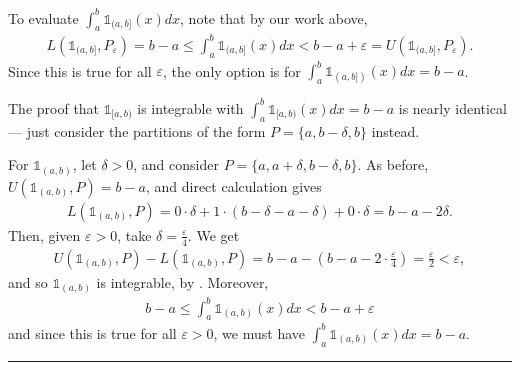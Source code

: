 \documentclass[letterpaper,10pt,english]{jupyterBook}
\begin{document}
\sphinxAtStartPar
To evaluate \(\int_a^b\mathbb{1}_{(a,b]}(x)dx\), note that by our work above,
\begin{equation*}
\begin{split}
L(\mathbb{1}_{(a,b]},P_\varepsilon) = b-a \leq \int_a^b\mathbb{1}_{(a,b]}(x)dx < b-a+\varepsilon = U(\mathbb{1}_{(a,b]},P_\varepsilon).
\end{split}
\end{equation*}
\sphinxAtStartPar
Since this is true for all \(\varepsilon\), the only option is for \( \int_a^b\mathbb{1}_{(a,b])}(x)dx = b-a\).

\sphinxAtStartPar
The proof that \(\mathbb{1}_{[a,b)}\) is integrable with \(\int_a^b\mathbb{1}_{[a,b)}(x)dx = b-a\) is nearly identical — just consider the partitions of the form \(P=\{a,b-\delta,b\}\) instead.

\sphinxAtStartPar
For \(\mathbb{1}_{(a,b)}\), let \(\delta>0\), and consider \(P=\{a,a+\delta,b-\delta,b\}\). As before, \(U(\mathbb{1}_{(a,b)},P)=b-a\), and direct calculation gives
\begin{equation*}
\begin{split}
L(\mathbb{1}_{(a,b)},P)= 0\cdot\delta + 1\cdot(b-\delta-a-\delta)+0\cdot\delta=b-a-2\delta.
\end{split}
\end{equation*}
\sphinxAtStartPar
Then, given \(\varepsilon>0\), take \(\delta=\frac{\varepsilon}{4}\). We get
\begin{equation*}
\begin{split}
U(\mathbb{1}_{(a,b)},P) -L(\mathbb{1}_{(a,b)},P) = b-a - \left(b-a-2\cdot\frac{\varepsilon}{4}\right)= \frac{\varepsilon}{2} < \varepsilon, 
\end{split}
\end{equation*}
\sphinxAtStartPar
and so \(\mathbb{1}_{(a,b)}\) is integrable, by . Moreover,
\begin{equation*}
\begin{split}
b-a \leq \int_a^b\mathbb{1}_{(a,b)}(x)dx < b-a+\varepsilon
\end{split}
\end{equation*}
\sphinxAtStartPar
and since this is true for all \(\varepsilon>0\), we must have \(\int_a^b\mathbb{1}_{(a,b)}(x)dx =b-a\).


\bigskip\hrule\bigskip
\end{document}
